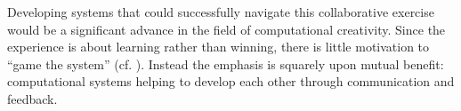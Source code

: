   Developing systems that could successfully navigate this
  collaborative exercise would be a significant advance in the field
  of computational creativity.  Since the experience is about learning
  rather than winning, there is little motivation to ``game the
  system'' (cf. ). Instead the emphasis is
  squarely upon mutual benefit: computational systems helping to
  develop each other through communication and feedback.
